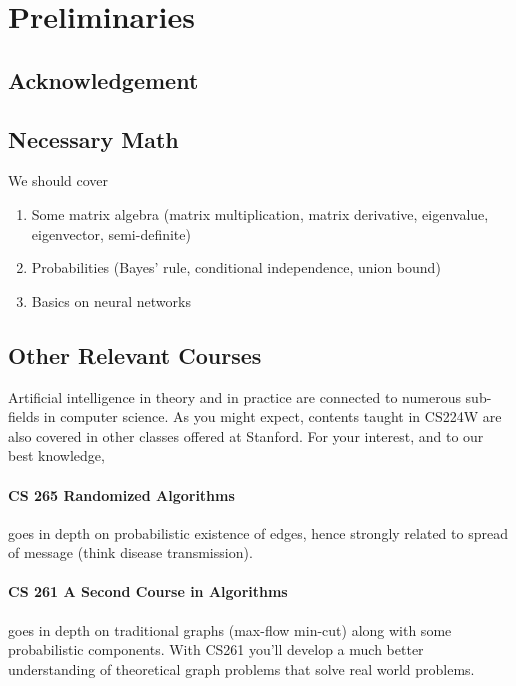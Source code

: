 \section{Preliminaries}

\subsection{Acknowledgement}\label{ss_01}

\subsection{Necessary Math}\label{ss_02}

\begin{todo}
We should cover
\begin{enumerate}
    \item Some matrix algebra (matrix multiplication, matrix derivative, eigenvalue, eigenvector, semi-definite)

    \item Probabilities (Bayes' rule, conditional independence, union bound)
    
    \item Basics on neural networks

\end{enumerate}{}

\end{todo}{}

\subsection{Other Relevant Courses}\label{ss_03}

Artificial intelligence in theory and in practice are connected to numerous sub-fields in computer science. As you might expect, contents taught in CS224W are also covered in other classes offered at Stanford. For your interest, and to our best knowledge, 

\paragraph{CS 265 Randomized Algorithms} goes in depth on probabilistic existence of edges, hence strongly related to spread of message (think disease transmission).

\paragraph{CS 261 A Second Course in Algorithms} goes in depth on traditional graphs (max-flow min-cut) along with some probabilistic components. With CS261 you'll develop a much better understanding of theoretical graph problems that solve real world problems.

